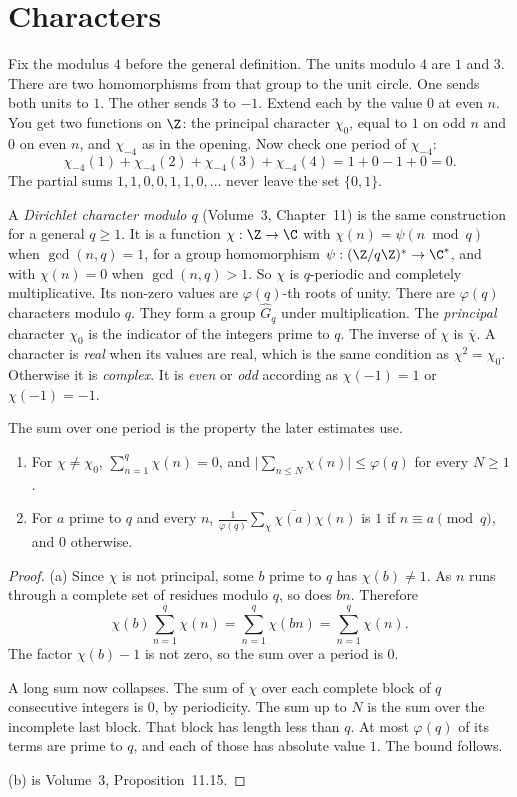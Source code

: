 \section{Characters}

Fix the modulus $4$ before the general definition. The units modulo $4$ are $1$ and $3$. There are two homomorphisms from that group to the unit circle. One sends both units to $1$. The other sends $3$ to $-1$. Extend each by the value $0$ at even $n$. You get two functions on $\Z$: the principal character $\chi_0$, equal to $1$ on odd $n$ and $0$ on even $n$, and $\chi_{-4}$ as in the opening. Now check one period of $\chi_{-4}$:
\[
\chi_{-4}(1)+\chi_{-4}(2)+\chi_{-4}(3)+\chi_{-4}(4)=1+0-1+0=0.
\]
The partial sums $1,1,0,0,1,1,0,\dots$ never leave the set $\{0,1\}$.

A \emph{Dirichlet character modulo $q$} (Volume~3, Chapter~11) is the same construction for a general $q\ge1$. It is a function $\chi:\Z\to\C$ with $\chi(n)=\psi(n\bmod q)$ when $\gcd(n,q)=1$, for a group homomorphism $\psi:(\Z/q\Z)^*\to\C^*$, and with $\chi(n)=0$ when $\gcd(n,q)>1$. So $\chi$ is $q$-periodic and completely multiplicative. Its non-zero values are $\varphi(q)$-th roots of unity. There are $\varphi(q)$ characters modulo $q$. They form a group $\widehat G_q$ under multiplication. The \emph{principal} character $\chi_0$ is the indicator of the integers prime to $q$. The inverse of $\chi$ is $\overline\chi$. A character is \emph{real} when its values are real, which is the same condition as $\chi^2=\chi_0$. Otherwise it is \emph{complex}. It is \emph{even} or \emph{odd} according as $\chi(-1)=1$ or $\chi(-1)=-1$.

The sum over one period is the property the later estimates use.

\begin{proposition}[orthogonality]\label{prop:orth}
\begin{enumerate}[label=(\alph*)]
\item For $\chi\ne\chi_0$, $\sum_{n=1}^q\chi(n)=0$, and $\bigl|\sum_{n\le N}\chi(n)\bigr|\le\varphi(q)$ for every $N\ge1$.
\item For $a$ prime to $q$ and every $n$, $\frac1{\varphi(q)}\sum_\chi\overline{\chi(a)}\chi(n)$ is $1$ if $n\equiv a\pmod q$, and $0$ otherwise.
\end{enumerate}
\end{proposition}
\begin{proof}
(a) Since $\chi$ is not principal, some $b$ prime to $q$ has $\chi(b)\ne1$. As $n$ runs through a complete set of residues modulo $q$, so does $bn$. Therefore
\[
\chi(b)\sum_{n=1}^q\chi(n)=\sum_{n=1}^q\chi(bn)=\sum_{n=1}^q\chi(n).
\]
The factor $\chi(b)-1$ is not zero, so the sum over a period is $0$.

A long sum now collapses. The sum of $\chi$ over each complete block of $q$ consecutive integers is $0$, by periodicity. The sum up to $N$ is the sum over the incomplete last block. That block has length less than $q$. At most $\varphi(q)$ of its terms are prime to $q$, and each of those has absolute value $1$. The bound follows.

(b) is Volume~3, Proposition~11.15.
\end{proof}

